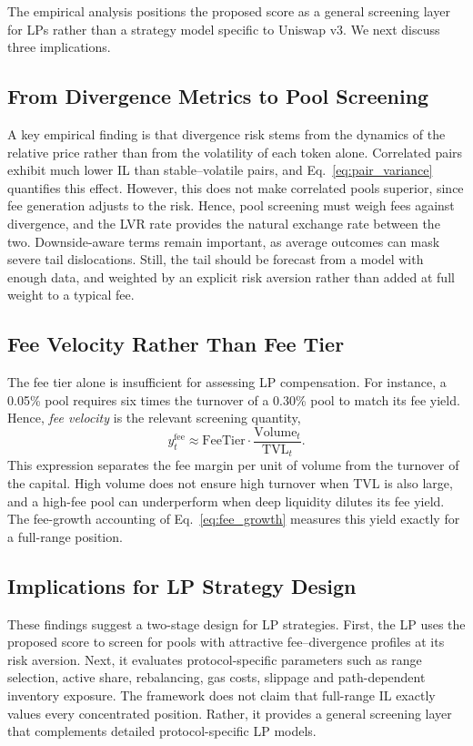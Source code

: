 \documentclass[10pt,conference,compsocconf]{IEEEtran}
\begin{document}
The empirical analysis positions the proposed score as a general screening layer for LPs rather than a strategy model specific to Uniswap v3. We next discuss three implications.

\subsection{From Divergence Metrics to Pool Screening}

A key empirical finding is that divergence risk stems from the dynamics of the relative price rather than from the volatility of each token alone. Correlated pairs exhibit much lower IL than stable--volatile pairs, and Eq.~\eqref{eq:pair_variance} quantifies this effect. However, this does not make correlated pools superior, since fee generation adjusts to the risk. Hence, pool screening must weigh fees against divergence, and the LVR rate provides the natural exchange rate between the two. Downside-aware terms remain important, as average outcomes can mask severe tail dislocations. Still, the tail should be forecast from a model with enough data, and weighted by an explicit risk aversion rather than added at full weight to a typical fee.

\subsection{Fee Velocity Rather Than Fee Tier}

The fee tier alone is insufficient for assessing LP compensation. For instance, a 0.05\% pool requires six times the turnover of a 0.30\% pool to match its fee yield. Hence, \emph{fee velocity} is the relevant screening quantity,
\[
y^{\mathrm{fee}}_t
\approx
\mathrm{FeeTier}
\cdot
\frac{\mathrm{Volume}_t}{\mathrm{TVL}_t}.
\]
This expression separates the fee margin per unit of volume from the turnover of the capital. High volume does not ensure high turnover when TVL is also large, and a high-fee pool can underperform when deep liquidity dilutes its fee yield. The fee-growth accounting of Eq.~\eqref{eq:fee_growth} measures this yield exactly for a full-range position.

\subsection{Implications for LP Strategy Design}

These findings suggest a two-stage design for LP strategies. First, the LP uses the proposed score to screen for pools with attractive fee--divergence profiles at its risk aversion. Next, it evaluates protocol-specific parameters such as range selection, active share, rebalancing, gas costs, slippage and path-dependent inventory exposure. The framework does not claim that full-range IL exactly values every concentrated position. Rather, it provides a general screening layer that complements detailed protocol-specific LP models.
\end{document}
